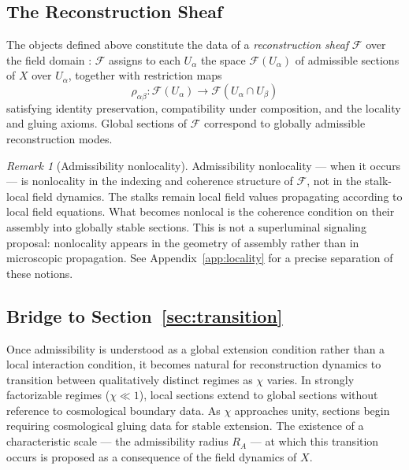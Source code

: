 \documentclass[11pt, a4paper]{article}
\theoremstyle{plain}
\theoremstyle{definition}
\theoremstyle{remark}
\newtheorem{remark}[theorem]{Remark}
\newcommand{\RA}{R_{\!A}}
\newcommand{\sheaf}{\mathcal{F}}
\begin{document}
\subsection{The Reconstruction Sheaf}

The objects defined above constitute the data of a \emph{reconstruction sheaf}
$\sheaf$ over the field domain \cite{bredon1997,kashiwara2005}: $\sheaf$ assigns to
each $U_\alpha$ the space $\sheaf(U_\alpha)$ of admissible sections of $X$ over
$U_\alpha$, together with restriction maps
\[
  \rho_{\alpha\beta} \colon \sheaf(U_\alpha) \longrightarrow \sheaf(U_\alpha \cap U_\beta)
\]
satisfying identity preservation, compatibility under composition, and the locality
and gluing axioms. Global sections of $\sheaf$ correspond to globally admissible
reconstruction modes.

\begin{remark}[Admissibility nonlocality]
\label{rem:nonlocal}
Admissibility nonlocality --- when it occurs --- is nonlocality in the indexing and
coherence structure of $\sheaf$, not in the stalk-local field dynamics. The stalks
remain local field values propagating according to local field equations. What becomes
nonlocal is the coherence condition on their assembly into globally stable sections.
This is not a superluminal signaling proposal: nonlocality appears in the geometry of
assembly rather than in microscopic propagation. See Appendix~\ref{app:locality} for
a precise separation of these notions.
\end{remark}

\subsection{Bridge to Section~\ref{sec:transition}}

Once admissibility is understood as a global extension condition rather than a local
interaction condition, it becomes natural for reconstruction dynamics to transition
between qualitatively distinct regimes as $\chi$ varies. In strongly factorizable
regimes ($\chi \ll 1$), local sections extend to global sections without reference to
cosmological boundary data. As $\chi$ approaches unity, sections begin requiring
cosmological gluing data for stable extension. The existence of a characteristic
scale --- the admissibility radius $\RA$ --- at which this transition occurs is
proposed as a consequence of the field dynamics of $X$.

\end{document}
